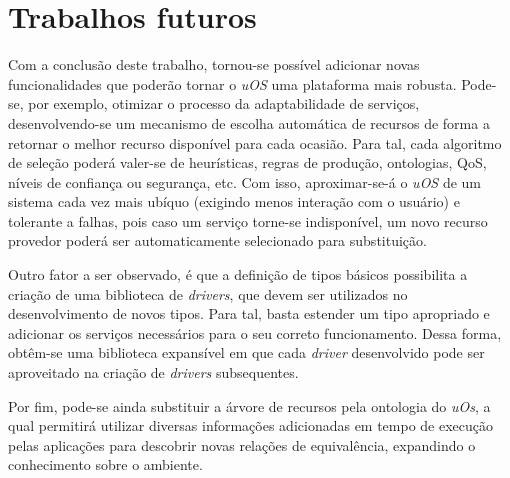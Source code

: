 \section{Trabalhos futuros}
\label{sec:trabalhosFuturos}

Com a conclusão deste trabalho, tornou-se possível adicionar novas funcionalidades que poderão tornar o \emph{uOS} uma plataforma mais robusta. Pode-se, por exemplo, otimizar o processo da adaptabilidade de serviços, desenvolvendo-se um mecanismo de escolha automática de recursos de forma a retornar o melhor recurso disponível para cada ocasião. Para tal, cada algoritmo de seleção poderá valer-se de heurísticas, regras de produção, ontologias, QoS, níveis de confiança ou segurança, etc. Com isso, aproximar-se-á o \emph{uOS} de um sistema cada vez mais ubíquo (exigindo menos interação com o usuário) e tolerante a falhas, pois caso um serviço torne-se indisponível, um novo recurso provedor poderá ser automaticamente selecionado para substituição.

Outro fator a ser observado, é que a definição de tipos básicos possibilita a criação de uma biblioteca de \emph{drivers}, que devem ser utilizados no desenvolvimento de novos tipos. Para tal, basta estender um tipo apropriado e adicionar os serviços necessários para o seu correto funcionamento. Dessa forma, obtêm-se uma biblioteca expansível em que cada \emph{driver} desenvolvido pode ser aproveitado na criação de \emph{drivers} subsequentes.

Por fim, pode-se ainda substituir a árvore de recursos pela ontologia do \emph{uOs}, a qual permitirá utilizar diversas informações adicionadas em tempo de execução pelas aplicações para descobrir novas relações de  equivalência, expandindo o conhecimento sobre o ambiente.